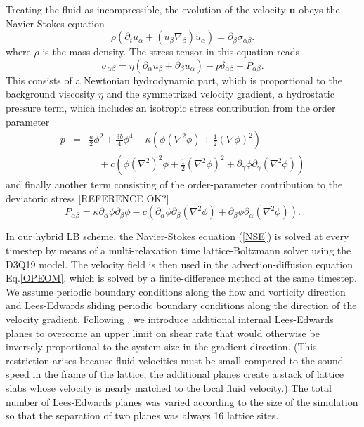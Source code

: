 \documentclass[8.5pt,twoside,twocolumn]{article}
\begin{document}
Treating the fluid as incompressible, the evolution of the velocity ${\bm u}$ obeys the Navier-Stokes equation
%
\begin{equation}\label{NSE}
\rho(\partial_t u_\alpha + (u_\beta \nabla_\beta) u_\alpha) = \partial_\beta \sigma_{\alpha \beta}. 
\end{equation}
%
where $\rho$ is the mass density. The stress tensor in this equation reads
%
\begin{equation}
\sigma_{\alpha \beta}=\eta (\partial_\alpha u_\beta + \partial_\beta u_\alpha)-p\delta_{\alpha\beta} - P_{\alpha \beta}. \label{fullstress}
\end{equation}
%
This consists of a Newtonian hydrodynamic part, which is proportional to the background viscosity $\eta$ and the symmetrized velocity gradient, a hydrostatic pressure term, which includes an isotropic stress contribution from the order parameter 
%
\begin{eqnarray}
p&=& \frac{a}{2}\phi^2+\frac{3b}{4}\phi^4-\kappa\left(\phi(\nabla^2\phi)+\frac{1}{2}({\nabla}\phi)^2\right)\nonumber\\
& &\quad+c\left(\phi(\nabla^2)^2\phi+\frac{1}{2}(\nabla^2\phi)^2+\partial_{\gamma}\phi\partial_\gamma(\nabla^2\phi)\right)
\end{eqnarray}
%
and finally another term consisting of the order-parameter contribution to the deviatoric stress
\cite{Yang76,Evans79} [REFERENCE OK?]
%
\begin{equation}
P_{\alpha \beta}=\kappa\partial_\alpha\phi\partial_\beta\phi -c \left(\partial_\alpha\phi\partial_\beta(\nabla^2\phi)+\partial_\beta\phi\partial_\alpha(\nabla^2\phi)\right).
\end{equation}

In our hybrid LB scheme, the Navier-Stokes equation (\ref{NSE}) is solved at every timestep by means of a multi-relaxation time lattice-Boltzmann solver \cite{dHumieres02,Adhikari05} using the D3Q19 model.
The velocity field is then used in the advection-diffusion equation Eq.\ref{OPEOM}, which is solved by a finite-difference method at the same timestep. We assume periodic boundary conditions along the flow and vorticity direction and Lees-Edwards sliding periodic boundary conditions\cite{leesedwards,Wagner02} along the direction of the velocity gradient.
Following \cite{Wagner02}, we introduce
additional internal Lees-Edwards planes to overcome an upper limit on shear rate that would otherwise be inversely proportional to the system size in the gradient direction. (This restriction arises because fluid velocities must be small compared to the sound speed in the frame of the lattice; the additional planes create a stack of lattice slabs whose velocity is nearly matched to the local fluid velocity.) 
The total number of Lees-Edwards planes was varied according to the size of the simulation so that the separation of two planes was always 16 lattice sites.  
\end{document}
